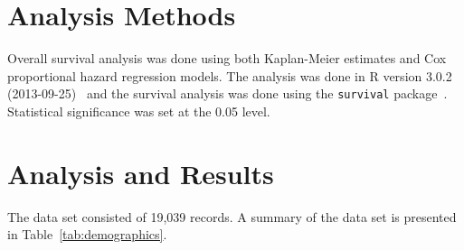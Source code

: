 \documentclass[letterpaper, 10pt]{article}\usepackage[]{graphicx}\usepackage[]{color}
\begin{document}

\section{Analysis Methods \label{sec:methods}} %

Overall survival analysis was done using both
Kaplan-Meier estimates and Cox proportional hazard regression models.  
The analysis was done in R version 3.0.2 (2013-09-25)~\cite{R-base} and the
survival analysis was done using the {\tt survival} package~\cite{R-survival}.
Statistical significance was set at the 0.05 level.


\section{Analysis and Results \label{sec:analysis}} %




The data set consisted of 19,039
records.  A summary of the data set is presented
in Table~\ref{tab:demographics}.  
\end{document}

